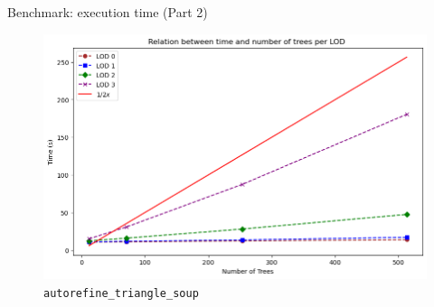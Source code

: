 \documentclass[10pt]{beamer}
\begin{document}
\begin{frame}{Benchmark: execution time (Part 2)}
  \Large
  \begin{figure}[H]
    \centering
    \includegraphics[width=1\textwidth]{images/bench_time_ntree_linear.png}
    \caption{\texttt{autorefine\_triangle\_soup}}
  \end{figure}
\end{frame}


\nocite{*}


\end{document}
